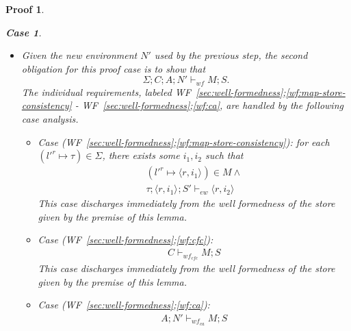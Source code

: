 \documentclass[showabstract,showacknowledgments,showpreface,showdedication,school]{iuphd}
\makeatletter
\newtheorem*{bcase}{Case}
\theoremstyle{nonumberplain}
\newtheorem{nproof}{Proof}
\newcommand{\keywd}[1]{\mathit{#1}}
\newcommand{\skeywd}[1]{\mathit{#1}}
\newcommand{\EXPR}{\keywd{e}}
\newcommand{\TYP}{\keywd{\tau}}
\newcommand{\var}{\svar}
\newcommand{\svar}{x}
\newcommand{\loc}{\skeywd{l}}
\newcommand{\concreteloc}[3]{\ensuremath{\langle #1, #2 \rangle ^{#3}}}
\newcommand{\reg}{\skeywd{r}}
\newcommand{\ind}{\keywd{i}}
\newcommand{\VAL}{\keywd{v}}
\newcommand{\STOR}{\keywd{S}}
\newcommand{\CENV}{\keywd{C}}
\newcommand{\SENV}{\keywd{\Sigma}}
\newcommand{\MENV}{\keywd{M}}
\newcommand{\AENV}{\keywd{A}}
\newcommand{\NENV}{\keywd{N}}
\newcommand{\locreg}[2]{\ensuremath{{#1}^{#2}}}
\newcommand{\tyatlocreg}[3]{#1 \ensuremath{@} \locreg{#2}{#3}}
\newcommand{\subst}[3]{\ensuremath{#1[#3/#2]}}
\newcommand{\ewitness}[4]{\ensuremath{#1;#2;#3 \vdash_{ew} #4}}
\newcommand{\storewf}[6]{\ensuremath{#1;#2;#3;#4 \vdash_{wf} #5;#6}}
\newcommand{\storewfcfa}[3]{\ensuremath{#1 \vdash_{wf_{cfc}} #2;#3}}
\newcommand{\storewfca}[4]{\ensuremath{#1;#2 \vdash_{wf_{ca}} #3;#4}}
\newcommand{\refwellformed}[2]{WF~\ref{#1};\ref{#2}}
\newcommand{\tfunctiondef}{T-Function-Definition}
\newcommand{\emptytenv}{\emptyset}
\newcommand{\overharpoon}[1]{\overrightharpoon{#1}}
\makeatother
\begin{document}
\begin{nproof}
\begin{bcase}
\begin{itemize}
    $\locreg{\loc}{\reg} \not \in \NENV'$, and $\AENV(\reg) = \locreg{\loc}{\reg}$,
    which altogether satisfy the requirements of \tfunctiondef{}.
    Now, by application of the Substitution Lemma,
    we have that
    \begin{align*}
    \emptytenv;\SENV;\CENV;\AENV;\NENV' \vdash \AENV; \NENV'; \subst{\EXPR}{\overharpoon{\var_1}}{\overharpoon{\VAL_1}} \subst{}{\overharpoon{\locreg{\loc'_1}{\reg'}}}{\overharpoon{\locreg{\loc_1}{\reg}}} \ldots \subst{}{\overharpoon{\var_n}}{\overharpoon{\VAL_n}} \subst{}{\overharpoon{\locreg{\loc'_n}{\reg'}}}{\overharpoon{\locreg{\loc_n}{\reg}}} : \tyatlocreg{\TYP}{\loc}{\reg}.
    \end{align*}
    \item Given the new environment $\NENV'$
    used by the previous step, the second obligation
    for this proof case is to show that
    \begin{displaymath}
    \storewf{\SENV}{\CENV}{\AENV}{\NENV'}{\MENV}{\STOR}.
    \end{displaymath}
    The individual requirements, labeled
    \refwellformed{sec:well-formedness}{wf:map-store-consistency} -
        \refwellformed{sec:well-formedness}{wf:ca},
        are handled by the following case analysis.
    \begin{itemize}
      \item
      Case (\refwellformed{sec:well-formedness}{wf:map-store-consistency}):
      for each $(\locreg{\loc'}{\reg} \mapsto \TYP) \in \SENV$, there exists some $\ind_1, \ind_2$ such that
      \begin{align}
      (\locreg{\loc'}{\reg} \mapsto \concreteloc{\reg}{\ind_1}{}) \in \MENV \wedge \\
        \ewitness{\TYP}{\concreteloc{\reg}{\ind_1}{}}{\STOR'}{\concreteloc{\reg}{\ind_2}{}}
      \end{align}
      This case discharges immediately from the well formedness of the store
      given by the premise of this lemma.
      \item Case (\refwellformed{sec:well-formedness}{wf:cfc}):
      \begin{align*}
      \storewfcfa{\CENV}{\MENV}{\STOR}
      \end{align*}
      This case discharges immediately from the well formedness of the store
      given by the premise of this lemma.
      \item Case (\refwellformed{sec:well-formedness}{wf:ca}):
      \begin{align*}
      \storewfca{\AENV}{\NENV'}{\MENV}{\STOR}

\end{align*}
\end{itemize}
\end{itemize}
\end{bcase}
\end{nproof}
\end{document}
